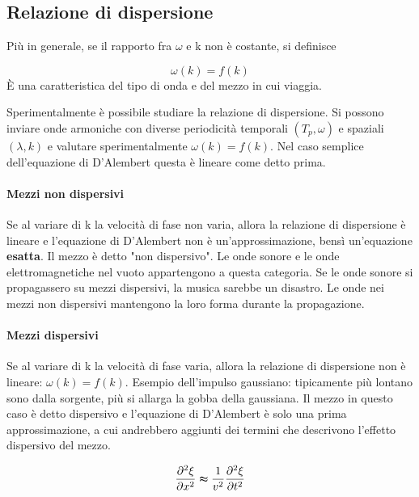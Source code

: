 \subsection{Relazione di dispersione}

Più in generale, se il rapporto fra \(\omega \) e k non è costante, si definisce

\begin{definition}
	\[
		\omega (k) = f(k)
	\]
	È una caratteristica del tipo di onda e del mezzo in cui viaggia.
\end{definition}

Sperimentalmente è possibile studiare la relazione di dispersione. Si possono inviare onde armoniche con diverse periodicità temporali \((T_p, \omega )\) e spaziali \((\lambda , k)\) e valutare sperimentalmente \(\omega (k) = f(k)\). Nel caso semplice dell'equazione di D'Alembert questa è lineare come detto prima.

\paragraph{Mezzi non dispersivi}

Se al variare di k la velocità di fase non varia, allora la relazione di dispersione è lineare e l'equazione di D'Alembert non è un'approssimazione, bensì un'equazione \textbf{esatta}. Il mezzo è detto "non dispersivo". Le onde sonore e le onde elettromagnetiche nel vuoto appartengono a questa categoria. Se le onde sonore si propagassero su mezzi dispersivi, la musica sarebbe un disastro. Le onde nei mezzi non dispersivi mantengono la loro forma durante la propagazione.

\paragraph{Mezzi dispersivi}

Se al variare di k la velocità di fase varia, allora la relazione di dispersione non è lineare: \(\omega (k) = f(k)\). Esempio dell'impulso gaussiano: tipicamente più lontano sono dalla sorgente, più si allarga la gobba della gaussiana. Il mezzo in questo caso è detto dispersivo e l'equazione di D'Alembert è solo una prima approssimazione, a cui andrebbero aggiunti dei termini che descrivono l'effetto dispersivo del mezzo.

\[
	\frac{\partial ^{2} \xi }{\partial x^{2} } \thickapprox \frac{1}{v^{2} }\frac{\partial ^{2} \xi }{\partial t^{2} } 
\]

